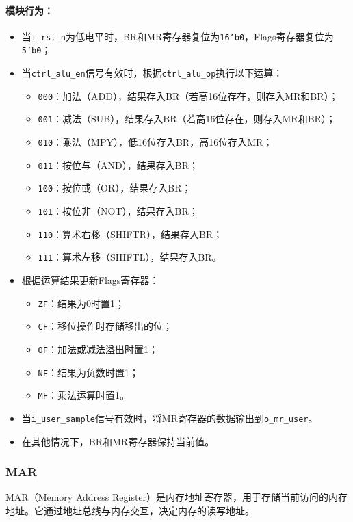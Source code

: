 \documentclass[lang=cn,a4paper,newtx]{elegantpaper}
\begin{document}
\paragraph{模块行为：}
\begin{itemize}
  \item 当\texttt{i\_rst\_n}为低电平时，BR和MR寄存器复位为\texttt{16'b0}，Flags寄存器复位为\texttt{5'b0}；
  \item 当\texttt{ctrl\_alu\_en}信号有效时，根据\texttt{ctrl\_alu\_op}执行以下运算：
    \begin{itemize}
      \item \texttt{000}：加法（ADD），结果存入BR（若高16位存在，则存入MR和BR）；
      \item \texttt{001}：减法（SUB），结果存入BR（若高16位存在，则存入MR和BR）；
      \item \texttt{010}：乘法（MPY），低16位存入BR，高16位存入MR；
      \item \texttt{011}：按位与（AND），结果存入BR；
      \item \texttt{100}：按位或（OR），结果存入BR；
      \item \texttt{101}：按位非（NOT），结果存入BR；
      \item \texttt{110}：算术右移（SHIFTR），结果存入BR；
      \item \texttt{111}：算术左移（SHIFTL），结果存入BR。
    \end{itemize}
  \item 根据运算结果更新Flags寄存器：
    \begin{itemize}
      \item \texttt{ZF}：结果为0时置1；
      \item \texttt{CF}：移位操作时存储移出的位；
      \item \texttt{OF}：加法或减法溢出时置1；
      \item \texttt{NF}：结果为负数时置1；
      \item \texttt{MF}：乘法运算时置1。
    \end{itemize}
  \item 当\texttt{i\_user\_sample}信号有效时，将MR寄存器的数据输出到\texttt{o\_mr\_user}。
  \item 在其他情况下，BR和MR寄存器保持当前值。
\end{itemize}

\subsubsection{MAR}
MAR（Memory Address Register）是内存地址寄存器，用于存储当前访问的内存地址。它通过地址总线与内存交互，决定内存的读写地址。
\end{document}

